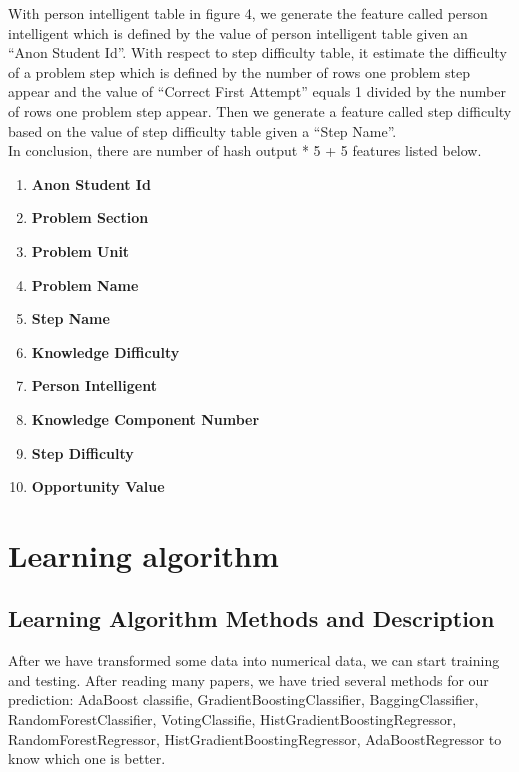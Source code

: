 \documentclass{article}
\begin{document}
With person intelligent table in figure 4, we generate the feature called person intelligent which is defined by the value of person intelligent table given an “Anon Student Id”. With respect to step difficulty table, it estimate the difficulty of a problem step which is defined by the number of rows one problem step appear and the value of “Correct First Attempt” equals 1 divided by the number of rows one problem step appear. Then we generate a feature called step difficulty based on the value of step difficulty table 
given a “Step Name”.\\
In conclusion, there are number of hash output * 5 + 5 features listed below.
	\begin{enumerate}[(1)]
	\item \textbf{Anon Student Id}
	\item \textbf{Problem Section}
	\item \textbf{Problem Unit}
	\item \textbf{Problem Name}
	\item \textbf{Step Name}
	\item \textbf{Knowledge Difficulty}
	\item \textbf{Person Intelligent}
	\item \textbf{Knowledge Component Number}
	\item \textbf{Step Difficulty}
	\item \textbf{Opportunity Value}
	\end{enumerate}

\section{Learning algorithm}

	\subsection{Learning Algorithm Methods and Description}
	After we have transformed some data into numerical data, we can start training and testing. After reading many papers, we have tried several methods for our prediction: AdaBoost classifie, GradientBoostingClassifier, BaggingClassifier, RandomForestClassifier, VotingClassifie, HistGradientBoostingRegressor, RandomForestRegressor, HistGradientBoostingRegressor, AdaBoostRegressor to know which one is better.
\end{document}
